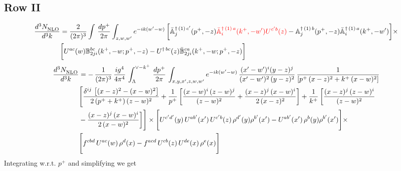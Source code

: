 \documentclass[9pt]{article}
\def\mf#1{\mathbb{#1}}
\numberwithin{equation}{section}
\begin{document}
\subsection{Row II\,}
\begin{align}
    \frac{d^{3}N_{\rm NLO}^{\rm}}{d^{3}k}  & =    \frac{2}{(2\pi)^{3}} \int\, \frac{dp^{+}}{2\pi}\int_{z,w,w^{\prime}} e^{-ik(w^{\prime}-w)}\,\bigg[\Bar{\mf{A}}^{\dagger\,(1)\, c^{\prime}}_{j}(p^{+},-z){\color{red}\Bar{\mf{A}}^{\dagger\, (1)\, a}_{i}(k^{+},- w^{\prime})U^{c^{\prime}b}(z)} - \mf{A}^{\dagger\, (1)\, b}_{j}(p^{+},- z)\Bar{\mf{A}}^{\dagger\, (1)\, a}_{i}(k^{+},- w^{\prime})\bigg] \times \notag \\ & \bigg[U^{ac}(w) \mf{B}^{bc}_{2ji}(k^{+},-w;p^{+},-z) -U^{\dagger\, bc}(z)\Bar{\mf{B}}^{ca}_{2ji}(k^{+},-w; p^{+},-z)\bigg] \nonumber
\end{align}
\begin{align}
    \frac{d^{3}N_{\rm NLO}^{\rm}}{d^{3}k}  & =  -\,\frac{1}{(2\pi)^{3}}\,\frac{ig^{4}}{4\pi^{4}}\,\int_{\Lambda}^{\vee-k^{+}}\,\frac{dp^{+}}{2\pi}\, \int_{x,y,x',z,w,w^{\prime}} e^{-ik(w^{\prime}-w)}\, \frac{(x'-w')^{i}(y-z)^{j}}{(x'-w')^{2}\,(y-z)^{2}}\, \frac{1}{\left[p^{+}\,(x-z)^{2}+k^{+}\,(x-w)^{2}\right]}\notag \\ & \Bigg[\frac{\delta^{ij}\, \left[(x-z)^{2}-(x-w)^{2}\right]}{2\, (p^{+}+k^{+})\,(z-w)^{2}}+\frac{1}{p^{+}}\, \bigg[\frac{(x-w)^{i}\,(z-w)^{j}}{(z-w)^{2}}+\frac{(x-z)^{j}\,(x-w)^{i}}{2\,(x-z)^{2}}\bigg]+\frac{1}{k^{+}}\,\bigg[\frac{(x-z)^{j}\,(z-w)^{i}}{(z-w)^{2}}\notag \\ & -\frac{(x-z)^{j}\,(x-w)^{i}}{2\,(x-w)^{2}}\bigg]\Bigg]\times \Bigg[U^{c'd'}(y)\,U^{ab'}(x')\,U^{c'b}(z)\,\rho^{d'}(y)\rho^{b'}(x')-U^{ab'}(x')\,\rho^{b}(y)\rho^{b'}(x')\Bigg]\times \notag \\ & \Bigg[f^{cbd}\,U^{ac}(w)\,\rho^{d}(x)-f^{acd}\, U^{cb}(z)\,U^{de}(x)\,\rho^{e}(x)\Bigg]
\end{align}
Integrating w.r.t. $p^{+}$ and simplifying we get
\end{document}
